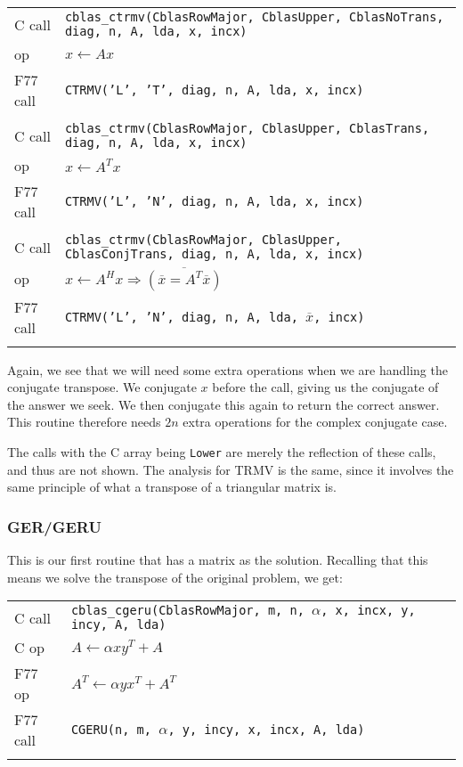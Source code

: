 \documentclass{article}
\begin{document}
\noindent
{ \small
\begin{tabular}{ll}
C call   & {\tt cblas\_ctrmv(CblasRowMajor, CblasUpper, CblasNoTrans, diag, n, A, lda, x, incx)}\\
op       & $x \leftarrow A x$\\
F77 call & {\tt CTRMV('L', 'T', diag, n, A, lda, x, incx)}\\\\
%
C call   & {\tt cblas\_ctrmv(CblasRowMajor, CblasUpper, CblasTrans, diag, n, A, lda, x, incx)}\\
op       & $x \leftarrow A^T x$\\
F77 call & {\tt CTRMV('L', 'N', diag, n, A, lda, x, incx)}\\\\
%
C call   & {\tt cblas\_ctrmv(CblasRowMajor, CblasUpper, CblasConjTrans, diag, n, A, lda, x, incx)}\\
op       & $x \leftarrow A^H x \Rightarrow \overline{(\overline{x} = A^T \overline{x})}$\\
F77 call & {\tt CTRMV('L', 'N', diag, n, A, lda, $\overline{x}$, incx)}\\\\
\end{tabular}
}

Again, we see that we will need some extra operations when we are handling the
conjugate transpose.  We conjugate $x$ before the call, giving us the conjugate
of the answer we seek.  We then conjugate this again to return the correct answer.
This routine therefore needs $2n$ extra operations for the complex conjugate case.

The calls with the C array being {\tt Lower} are merely the reflection of these
calls, and thus are not shown.  The analysis for TRMV is the same, since it
involves the same principle of what a transpose of a triangular matrix is.

\subsubsection{GER/GERU}

This is our first routine that has a matrix as the solution.  Recalling that
this means we solve the transpose of the original problem, we get:

{ \small
\noindent
\begin{tabular}{ll}
C call   & {\tt cblas\_cgeru(CblasRowMajor, m, n, $\alpha$, x, incx, y, incy, A, lda)}\\
C op     & $A \leftarrow \alpha x y^T + A$ \\
F77 op   & $A^T \leftarrow \alpha y x^T +A^T$ \\
F77 call & {\tt CGERU(n, m, $\alpha$, y, incy, x, incx, A, lda)}\\\\
\end{tabular}
}
\end{document}
